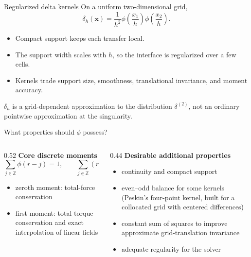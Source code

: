 \documentclass[aspectratio=169,11pt]{beamer}
\newcommand{\xvec}{\bm{x}}
\begin{document}
\begin{frame}{Regularized delta kernels}
On a uniform two-dimensional grid,
\[
  \boxed{
  \delta_h(\xvec)
  =
  \frac{1}{h^2}
  \phi\!\left(\frac{x_1}{h}\right)
  \phi\!\left(\frac{x_2}{h}\right)
  }.
\]
\begin{itemize}\itemsep7pt
  \item Compact support keeps each transfer local.
  \item The support width scales with \(h\), so the interface is regularized over a few cells.
  \item Kernels trade support size, smoothness, translational invariance, and moment accuracy.
\end{itemize}
\begin{punchbox}
\small \(\delta_h\) is a grid-dependent approximation to the distribution \(\delta^{(2)}\), not an ordinary pointwise approximation at the singularity.
\end{punchbox}
\end{frame}

\begin{frame}{What properties should \(\phi\) possess?}
\begin{columns}[T,onlytextwidth]
\begin{column}{0.52\textwidth}
\textbf{Core discrete moments}
\[
  \sum_{j\in\mathbb Z}\phi(r-j)=1,
  \qquad
  \sum_{j\in\mathbb Z}(r-j)\phi(r-j)=0.
\]
\begin{itemize}\itemsep5pt
  \item zeroth moment: total-force conservation
  \item first moment: total-torque conservation and exact interpolation of linear fields
\end{itemize}
\end{column}
\begin{column}{0.44\textwidth}
\textbf{Desirable additional properties}
\begin{itemize}\itemsep6pt
  \item continuity and compact support
  \item even--odd balance for some kernels (Peskin's four-point kernel, built for a collocated grid with centered differences)
  \item constant sum of squares to improve approximate grid-translation invariance
  \item adequate regularity for the solver
\end{itemize}
\end{column}
\end{columns}
\end{frame}
\end{document}
